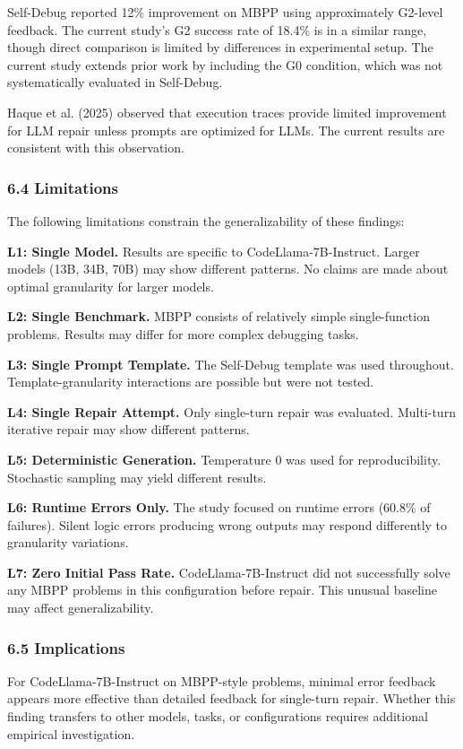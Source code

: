 Self-Debug \citep{chen2023selfdebug} reported 12\% improvement on MBPP using approximately G2-level feedback. The current study's G2 success rate of 18.4\% is in a similar range, though direct comparison is limited by differences in experimental setup. The current study extends prior work by including the G0 condition, which was not systematically evaluated in Self-Debug.

Haque et al. (2025) observed that execution traces provide limited improvement for LLM repair unless prompts are optimized for LLMs. The current results are consistent with this observation.

\subsubsection{6.4 Limitations}

The following limitations constrain the generalizability of these findings:

\textbf{L1: Single Model.} Results are specific to CodeLlama-7B-Instruct. Larger models (13B, 34B, 70B) may show different patterns. No claims are made about optimal granularity for larger models.

\textbf{L2: Single Benchmark.} MBPP consists of relatively simple single-function problems. Results may differ for more complex debugging tasks.

\textbf{L3: Single Prompt Template.} The Self-Debug template was used throughout. Template-granularity interactions are possible but were not tested.

\textbf{L4: Single Repair Attempt.} Only single-turn repair was evaluated. Multi-turn iterative repair may show different patterns.

\textbf{L5: Deterministic Generation.} Temperature 0 was used for reproducibility. Stochastic sampling may yield different results.

\textbf{L6: Runtime Errors Only.} The study focused on runtime errors (60.8\% of failures). Silent logic errors producing wrong outputs may respond differently to granularity variations.

\textbf{L7: Zero Initial Pass Rate.} CodeLlama-7B-Instruct did not successfully solve any MBPP problems in this configuration before repair. This unusual baseline may affect generalizability.

\subsubsection{6.5 Implications}

For CodeLlama-7B-Instruct on MBPP-style problems, minimal error feedback appears more effective than detailed feedback for single-turn repair. Whether this finding transfers to other models, tasks, or configurations requires additional empirical investigation.
